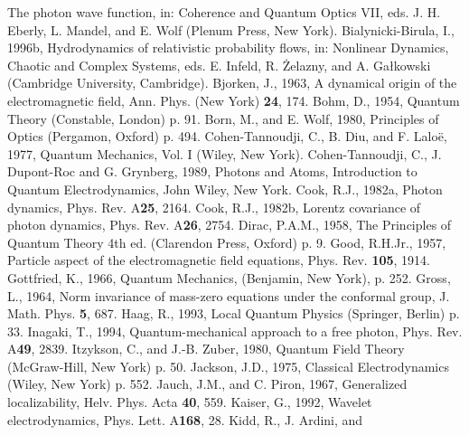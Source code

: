 \documentclass{article}
\begin{document}
\begin{thebibliography}{References}
The photon wave function, in: Coherence and Quantum Optics VII, eds. J. H.
Eberly, L. Mandel, and E. Wolf (Plenum Press, New York).
 Bialynicki-Birula, I., 1996b,
Hydrodynamics of relativistic probability flows, in: Nonlinear Dynamics,
Chaotic and Complex Systems, eds. E. Infeld, R. {\.Z}elazny, and A.
Ga{\l}kowski (Cambridge University, Cambridge).
 Bjorken, J., 1963, A dynamical origin
of the electromagnetic field, Ann. Phys. (New York) {\bf 24}, 174.
 Bohm, D., 1954, Quantum Theory (Constable,
London) p. 91.
 Born, M., and E. Wolf, 1980,
Principles of Optics (Pergamon, Oxford) p. 494.
Cohen-Tannoudji, C., B. Diu, and F. Lalo\"e, 1977, Quantum Mechanics, Vol. I
(Wiley, New York).
Cohen-Tannoudji, C., J. Dupont-Roc and G. Grynberg, 1989, Photons and Atoms,
Introduction to Quantum Electrodynamics, John Wiley, New York.
 Cook, R.J., 1982a, Photon dynamics, Phys.
Rev. A{\bf 25}, 2164.
 Cook, R.J., 1982b, Lorentz covariance of
photon dynamics, Phys. Rev. A{\bf 26}, 2754.
 Dirac, P.A.M., 1958, The Principles of
Quantum Theory 4th ed. (Clarendon Press, Oxford) p. 9.
 Good, R.H.Jr., 1957, Particle aspect of the
electromagnetic field equations, Phys. Rev. {\bf 105}, 1914.
 Gottfried, K., 1966, Quantum
Mechanics, (Benjamin, New York), p. 252.
 Gross, L., 1964, Norm invariance of
mass-zero equations under the conformal group, J. Math. Phys. {\bf 5}, 687.
 Haag, R., 1993, Local Quantum Physics
(Springer, Berlin) p. 33.
 Inagaki, T., 1994, Quantum-mechanical
approach to a free photon, Phys. Rev. A{\bf 49}, 2839.
 Itzykson, C., and J.-B. Zuber,
1980, Quantum Field Theory (McGraw-Hill, New York) p. 50.
 Jackson, J.D., 1975, Classical
Electrodynamics (Wiley, New York) p. 552.
 Jauch, J.M., and C. Piron, 1967,
Generalized localizability, Helv. Phys. Acta {\bf 40}, 559.
 Kaiser, G., 1992, Wavelet electrodynamics, Phys. Lett. A{\bf 168}, 28.
 Kidd, R., J. Ardini, and

\end{thebibliography}
\end{document}
